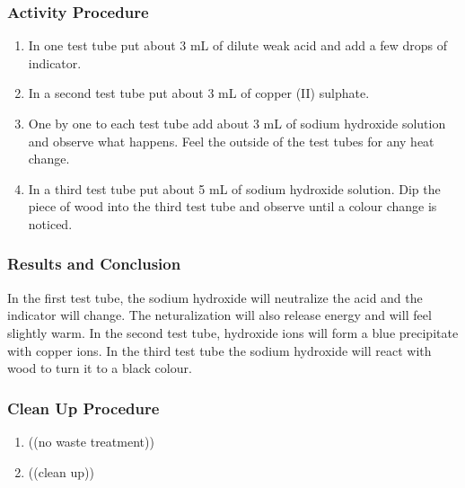 \subsubsection*{Activity Procedure}
\begin{enumerate}
\item{In one test tube put about 3 mL of dilute weak acid and add a few drops of indicator.}
\item{ In a second test tube put about 3 mL of copper (II) sulphate.}
\item{One by one to each test tube add about 3 mL of sodium hydroxide solution and observe what happens. Feel the outside of the test tubes for any heat change.}
\item{In a third test tube put about 5 mL of sodium hydroxide solution. Dip the piece of wood into the third test tube and observe until a colour change is noticed.}
\end{enumerate}

\subsubsection*{Results and Conclusion}
In the first test tube, the sodium hydroxide will neutralize the acid and the indicator will change. The neturalization will also release energy and will feel slightly warm.
In the second test tube, hydroxide ions will form a blue precipitate with copper ions.
In the third test tube the sodium hydroxide will react with wood to turn it to a black colour.

\subsubsection*{Clean Up Procedure}
\begin{enumerate}
\item{((no waste treatment))}
\item{((clean up))}
\end{enumerate}